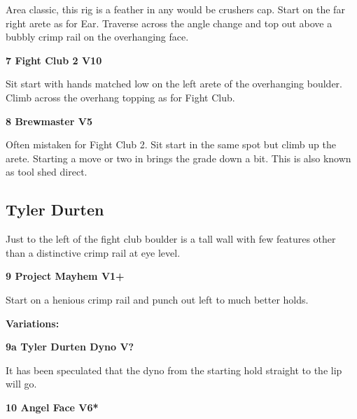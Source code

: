 \begin{multicols}{2}
					\begin{adjustwidth}{0.5cm}{}				
					Area classic, this rig is a feather in any would be crushers cap. Start on the far right arete as for Ear. Traverse across the angle change and top out above a bubbly crimp rail on the overhanging face.
					\end{adjustwidth}

					\label{rt:Fight Club 2}
\colorbox{red!20}{
\parbox{0.95\linewidth}{
\textbf{
7 Fight Club 2 V10  
}
}
}

					\begin{adjustwidth}{0.5cm}{}				
					Sit start with hands matched low on the left arete of the overhanging boulder. Climb across the overhang topping as for Fight Club.
					\end{adjustwidth}
					\label{rt:Brewmaster}
\colorbox{RoyalBlue!20}{
\parbox{0.95\linewidth}{
\textbf{
8 Brewmaster V5  
}
}
}

					\begin{adjustwidth}{0.5cm}{}				
					Often mistaken for Fight Club 2. Sit start in the same spot but climb up the arete. Starting a move or two in brings the grade down a bit. This is also known as tool shed direct.
					\end{adjustwidth}
			\subsection*{Tyler Durten}\label{bf:Tyler Durten}
			Just to the left of the fight club boulder is a tall wall with few features other than a distinctive crimp rail at eye level.\\
			
					\label{rt:Project Mayhem}
\colorbox{green!20}{
\parbox{0.95\linewidth}{
\textbf{
9 Project Mayhem V1+  
}
}
}

					\begin{adjustwidth}{0.5cm}{}				
					Start on a henious crimp rail and punch out left to much better holds.
					\end{adjustwidth}
						\begin{adjustwidth}{0.5cm}{}				
						\textbf{Variations:} \newline
							\label{vr:Tyler Durten Dyno}
\colorbox{black!20}{
\parbox{0.95\linewidth}{
\textbf{
9a Tyler Durten Dyno V?  
}
}
}

							\begin{adjustwidth}{0.5cm}{}				
							It has been speculated that the dyno from the starting hold straight to the lip will go.
							\end{adjustwidth}
						\end{adjustwidth}
					\label{rt:Angel Face}
\colorbox{RoyalBlue!20}{
\parbox{0.95\linewidth}{
\textbf{
10 Angel Face V6*  
}
}
}


\end{multicols}
